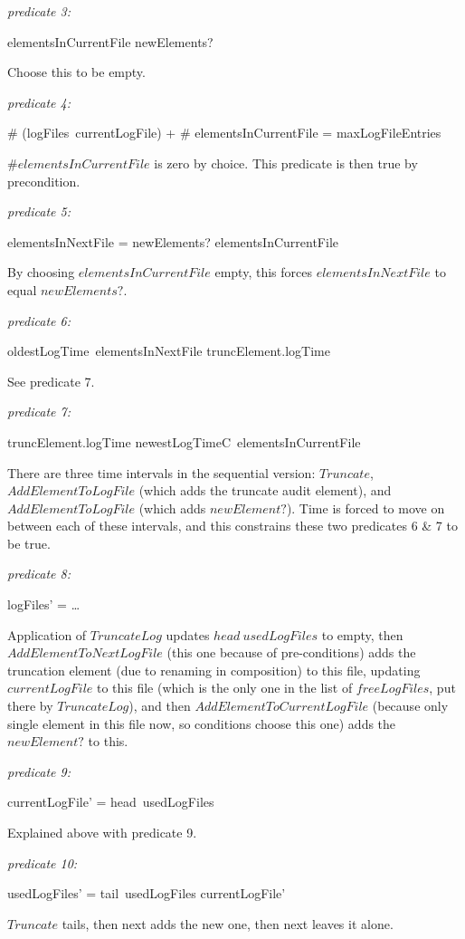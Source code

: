 {\em predicate 3:}
\begin{argue}
	elementsInCurrentFile \subseteq newElements?
\end{argue}
Choose this to be empty.

{\em predicate 4:}
\begin{argue}
	\# (logFiles~currentLogFile) + \# elementsInCurrentFile = maxLogFileEntries
\end{argue}
$\# elementsInCurrentFile$ is zero by choice.
This predicate is then true by precondition.

{\em predicate 5:}
\begin{argue}
	elementsInNextFile = newElements? \setminus elementsInCurrentFile
\end{argue}
By choosing $elementsInCurrentFile$ empty,
this forces $elementsInNextFile$ to equal $newElements?$.

{\em predicate 6:}
\begin{argue}
	oldestLogTime~elementsInNextFile \geq truncElement.logTime
\end{argue}
See predicate 7.

{\em predicate 7:}
\begin{argue}
	truncElement.logTime \geq newestLogTimeC~elementsInCurrentFile 
\end{argue}
There are three time intervals in the sequential version:
$Truncate$, $AddElementToLogFile$ 
(which adds the truncate audit element),
and $AddElementToLogFile$ 
(which adds $newElement?$).
Time is forced to move on between each of these intervals,
and this constrains these two predicates 6 \& 7 to be true.

{\em predicate 8:}
\begin{argue}
	logFiles' = \ldots
\end{argue}
Application of $TruncateLog$ updates $head~usedLogFiles$ to empty,
then $AddElementToNextLogFile$ (this one because of pre-conditions)
adds the truncation element (due to renaming in composition) to this file,
updating $currentLogFile$ to this file
(which is the only one in the list of $freeLogFiles$, put there by $TruncateLog$),
and then $AddElementToCurrentLogFile$ 
(because only single element in this file now,
so conditions choose this one)
adds the $newElement?$ to this.


{\em predicate 9:}
\begin{argue}
	currentLogFile' = head~usedLogFiles
\end{argue}
Explained above with predicate 9.

{\em predicate 10:}
\begin{argue}
	usedLogFiles' = tail~usedLogFiles \cat \langle currentLogFile' \rangle
\end{argue}
$Truncate$ tails, then next adds the new one, then next leaves it alone.

